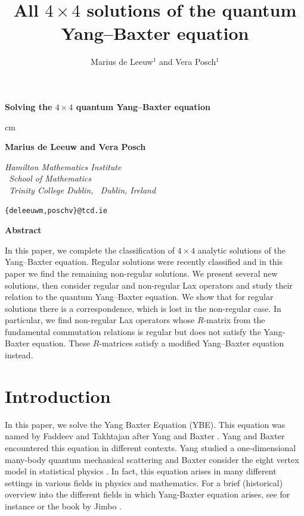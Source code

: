 \documentclass{article}
\title{All $4\times4$ solutions of the quantum Yang--Baxter equation}
\author{Marius de Leeuw$^1$ and Vera Posch$^1$}
\begin{document}
\begin{titlepage}


\centerline{\large \bf Solving the $4\times 4$ quantum Yang--Baxter equation}
 cm

\centerline{{\bf Marius de Leeuw and Vera Posch}  }

\vskip 1.1cm

\begin{center}
\sl Hamilton Mathematics Institute\\
~School of Mathematics\\
~Trinity College Dublin, 
~Dublin, Ireland\\ \vspace{0.2cm}
\end{center}
\vskip 0.7cm

\centerline{\small\tt \{deleeuwm,poschv\}@tcd.ie}


\vskip 1.7cm \centerline{\bf Abstract} \vskip 0.2cm \noindent
In this paper, we complete the classification of $4\times4$ analytic solutions of the Yang--Baxter equation. Regular solutions were recently classified and in this paper we find the remaining non-regular solutions. We present several new solutions, then consider regular and non-regular Lax operators and study their relation to the quantum Yang--Baxter equation.  We show that for regular solutions there is a correspondence, which is lost in the non-regular case. In particular, we find non-regular Lax operators whose $R$-matrix from the fundamental commutation relations is regular but does not satisfy the Yang-Baxter equation.  These $R$-matrices satisfy a modified Yang--Baxter equation instead.

\end{titlepage}



\section{Introduction}

In this paper, we solve the Yang Baxter Equation (YBE). This equation was named by Faddeev and Takhtajan after Yang and Baxter \cite{TakFaddeev}. Yang and Baxter encountered this equation in different contexts. Yang studied a one-dimensional many-body quantum mechanical scattering \cite{Phys} and Baxter consider the eight vertex model in statistical physics \cite{BAXTER}. In fact, this equation arises in many different settings in various fields in physics and mathematics. For a brief (historical) overview into the different fields in which Yang-Baxter equation arises, see for instance \cite{perk2006yangbaxterequations} or the book by Jimbo \cite{jimbo1990yang}. 
\end{document}
